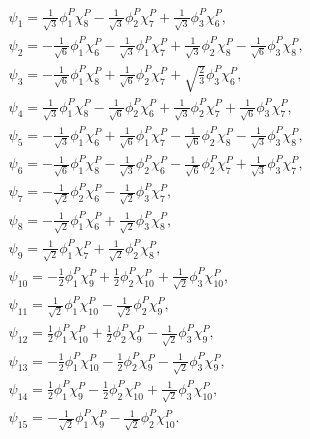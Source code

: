 \documentclass[prd,twocolumn,floatfix,nofootinbib]{revtex4}
\begin{document}
\begin{align}
    &\psi_{1} = \frac{1}{\sqrt{3}}\phi_{1}^{P}\chi_{8}^{P}-\frac{1}{\sqrt{3}}\phi_{2}^{P}\chi_{7}^{P}+\frac{1}{\sqrt{3}}\phi_{3}^{P}\chi_{6}^{P}, \\
    &\psi_{2} = -\frac{1}{\sqrt{6}}\phi_{1}^{P}\chi_{6}^{P}-\frac{1}{\sqrt{3}}\phi_{1}^{P}\chi_{7}^{P}+\frac{1}{\sqrt{3}}\phi_{2}^{P}\chi_{8}^{P}
        -\frac{1}{\sqrt{6}}\phi_{3}^{P}\chi_{8}^{P}, \\
    &\psi_{3} = -\frac{1}{\sqrt{6}}\phi_{1}^{P}\chi_{8}^{P}+\frac{1}{\sqrt{6}}\phi_{2}^{P}\chi_{7}^{P}+\sqrt{\frac{2}{3}}\phi_{3}^{P}\chi_{6}^{P}, \\
    &\psi_{4} = \frac{1}{\sqrt{3}}\phi_{1}^{P}\chi_{8}^{P}-\frac{1}{\sqrt{6}}\phi_{2}^{P}\chi_{6}^{P}+\frac{1}{\sqrt{3}}\phi_{2}^{P}\chi_{7}^{P}
        +\frac{1}{\sqrt{6}}\phi_{3}^{P}\chi_{7}^{P}, \\
    &\psi_{5} = -\frac{1}{\sqrt{3}}\phi_{1}^{P}\chi_{6}^{P}+\frac{1}{\sqrt{6}}\phi_{1}^{P}\chi_{7}^{P}-\frac{1}{\sqrt{6}}\phi_{2}^{P}\chi_{8}^{P}
        -\frac{1}{\sqrt{3}}\phi_{3}^{P}\chi_{8}^{P}, \\
    &\psi_{6} = -\frac{1}{\sqrt{6}}\phi_{1}^{P}\chi_{8}^{P}-\frac{1}{\sqrt{3}}\phi_{2}^{P}\chi_{6}^{P}-\frac{1}{\sqrt{6}}\phi_{2}^{P}\chi_{7}^{P}
        +\frac{1}{\sqrt{3}}\phi_{3}^{P}\chi_{7}^{P}, \\
    &\psi_{7} = -\frac{1}{\sqrt{2}}\phi_{2}^{P}\chi_{6}^{P}-\frac{1}{\sqrt{2}}\phi_{3}^{P}\chi_{7}^{P}, \\
    &\psi_{8} = -\frac{1}{\sqrt{2}}\phi_{1}^{P}\chi_{6}^{P}+\frac{1}{\sqrt{2}}\phi_{3}^{P}\chi_{8}^{P}, \\
    &\psi_{9} = \frac{1}{\sqrt{2}}\phi_{1}^{P}\chi_{7}^{P}+\frac{1}{\sqrt{2}}\phi_{2}^{P}\chi_{8}^{P}, \\
    &\psi_{10} = -\frac{1}{2}\phi_{1}^{P}\chi_{9}^{P}+\frac{1}{2}\phi_{2}^{P}\chi_{10}^{P}+\frac{1}{\sqrt{2}}\phi_{3}^{P}\chi_{10}^{P}, \\
    &\psi_{11} = \frac{1}{\sqrt{2}}\phi_{1}^{P}\chi_{10}^{P}-\frac{1}{\sqrt{2}}\phi_{2}^{P}\chi_{9}^{P}, \\
    &\psi_{12} = \frac{1}{2}\phi_{1}^{P}\chi_{10}^{P}+\frac{1}{2}\phi_{2}^{P}\chi_{9}^{P}-\frac{1}{\sqrt{2}}\phi_{3}^{P}\chi_{9}^{P}, \\
    &\psi_{13} = -\frac{1}{2}\phi_{1}^{P}\chi_{10}^{P}-\frac{1}{2}\phi_{2}^{P}\chi_{9}^{P}-\frac{1}{\sqrt{2}}\phi_{3}^{P}\chi_{9}^{P}, \\
    &\psi_{14} = \frac{1}{2}\phi_{1}^{P}\chi_{9}^{P}-\frac{1}{2}\phi_{2}^{P}\chi_{10}^{P}+\frac{1}{\sqrt{2}}\phi_{3}^{P}\chi_{10}^{P}, \\
    &\psi_{15} = -\frac{1}{\sqrt{2}}\phi_{1}^{P}\chi_{9}^{P}-\frac{1}{\sqrt{2}}\phi_{2}^{P}\chi_{10}^{P}.
\end{align}
\end{document}
